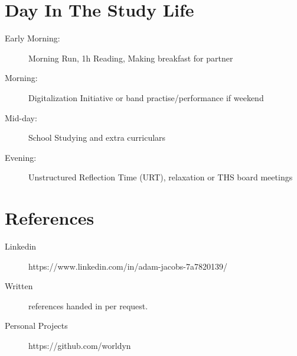 \documentclass[margin,line,a4paper]{resume}
\begin{document}
\begin{resume}
\section{\mysidestyle Day In The Study Life}\vspace{1mm}
    \begin{description}
        \item[Early Morning:] Morning Run, 1h Reading, Making breakfast for partner
        \item[Morning:] Digitalization Initiative or band practise/performance if weekend
        \item[Mid-day:] School Studying and extra curriculars
         \item[Evening:] Unstructured Reflection Time (URT), relaxation or THS board meetings
    \end{description} 

\section{\mysidestyle References}
\begin{description}
    \item[Linkedin] https://www.linkedin.com/in/adam-jacobs-7a7820139/
    \item[Written] references handed in per request.
    \item[Personal Projects] https://github.com/worldyn
\end{description}

\end{resume}
\end{document}
